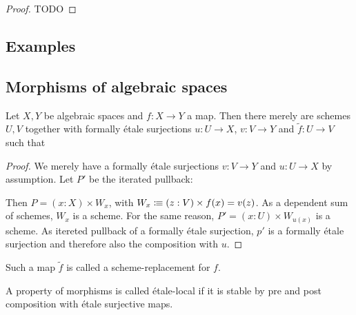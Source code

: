 \begin{proof}
TODO
\end{proof}

\subsection{Examples}

\subsection{Morphisms of algebraic spaces}

\begin{lemma}
  Let $X,Y$ be algebraic spaces and $f:X\to Y$ a map.
  Then there merely are schemes $U,V$ together with formally étale surjections
  $u:U\to X$, $v:V\to Y$ and $\widetilde{f}:U\to V$ such that
  \begin{center}
  \end{center}
\end{lemma}

\begin{proof}
  We merely have a formally étale surjections $v:V\to Y$ and $u:U\to X$ by assumption.
  Let $P'$ be the iterated pullback:
  \begin{center}
  \end{center}
  Then $P=(x:X)\times W_x$, with $W_x\vcentcolon\mspace{-1.2mu}\equiv (z:V)\times f(x)=v(z)$.
  As a dependent sum of schemes, $W_x$ is a scheme.
  For the same reason, $P'=(x:U)\times W_{u(x)}$ is a scheme.
  As itereted pullback of a formally étale surjection,
  $p'$ is a formally étale surjection and
  therefore also the composition with $u$.
\end{proof}

Such a map $\widetilde{f}$ is called a scheme-replacement for $f$.

\begin{definition}
A property of morphisms is called étale-local if it is stable by pre and post composition with étale surjective maps.
\end{definition}

